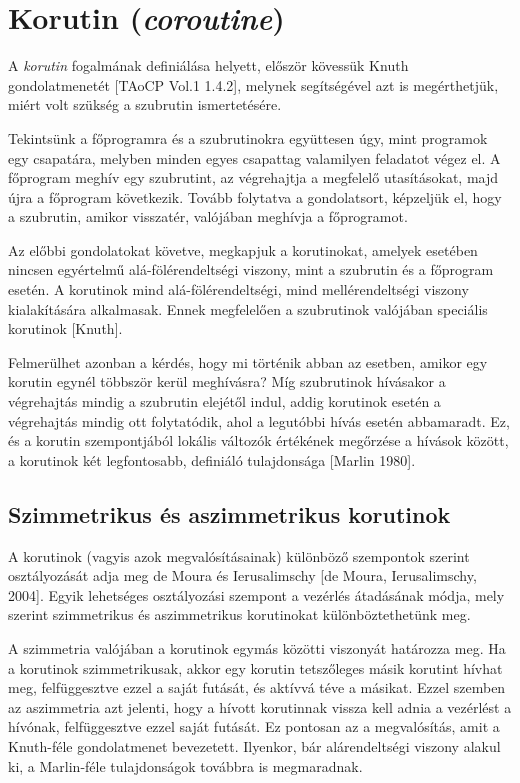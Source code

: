 \section{Korutin (\textit{coroutine})}

A \textit{korutin} fogalmának definiálása helyett, először kövessük Knuth gondolatmenetét [TAoCP Vol.1 1.4.2], melynek segítségével azt is megérthetjük, miért volt szükség a szubrutin ismertetésére.

Tekintsünk a főprogramra és a szubrutinokra együttesen úgy, mint programok egy csapatára, melyben minden egyes csapattag valamilyen feladatot végez el. A főprogram meghív egy szubrutint, az végrehajtja a megfelelő utasításokat, majd újra a főprogram következik. Tovább folytatva a gondolatsort, képzeljük el, hogy a szubrutin, amikor visszatér, valójában meghívja a főprogramot. 

Az előbbi gondolatokat követve, megkapjuk a korutinokat, amelyek esetében nincsen egyértelmű alá-fölérendeltségi viszony, mint a szubrutin és a főprogram esetén. A korutinok mind alá-fölérendeltségi, mind mellérendeltségi viszony kialakítására alkalmasak. Ennek megfelelően a szubrutinok valójában speciális korutinok [Knuth].

Felmerülhet azonban a kérdés, hogy mi történik abban az esetben, amikor egy korutin egynél többször kerül meghívásra? Míg szubrutinok hívásakor a végrehajtás mindig a szubrutin elejétől indul, addig korutinok esetén a végrehajtás mindig ott folytatódik, ahol a legutóbbi hívás esetén abbamaradt. Ez, és a korutin szempontjából lokális változók értékének megőrzése a hívások között, a korutinok két legfontosabb, definiáló tulajdonsága [Marlin 1980].

\subsection{Szimmetrikus és aszimmetrikus korutinok}

A korutinok (vagyis azok megvalósításainak) különböző szempontok szerint osztályozását adja meg de Moura és Ierusalimschy [de Moura, Ierusalimschy, 2004]. Egyik lehetséges osztályozási szempont a vezérlés átadásának módja, mely szerint szimmetrikus és aszimmetrikus korutinokat különböztethetünk meg.

A szimmetria valójában a korutinok egymás közötti viszonyát határozza meg. Ha a korutinok szimmetrikusak, akkor egy korutin tetszőleges másik korutint hívhat meg, felfüggesztve ezzel a saját futását, és aktívvá téve a másikat. Ezzel szemben az aszimmetria azt jelenti, hogy a hívott korutinnak vissza kell adnia a vezérlést a hívónak, felfüggesztve ezzel saját futását. Ez pontosan az a megvalósítás, amit a Knuth-féle gondolatmenet bevezetett. Ilyenkor, bár alárendeltségi viszony alakul ki, a Marlin-féle tulajdonságok továbbra is megmaradnak.

